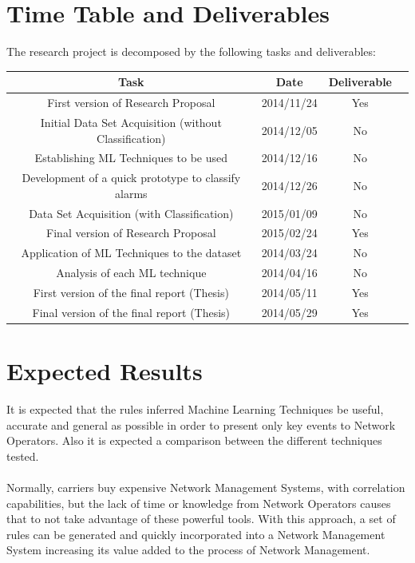 \documentclass[10pt,a4paper]{article}
\begin{document}
  \section{Time Table and Deliverables}
The research project is decomposed by the following tasks and deliverables:

\begin{center}
 \begin{tabular}{||c | c | c | c||} 
 \hline
 Task & Date & Deliverable \\ [0.7ex] 
 \hline\hline
 First version of Research Proposal  & 2014/11/24 & Yes \\ 
 \hline
 Initial Data Set Acquisition (without Classification) & 2014/12/05 & No \\ 
 \hline
 Establishing ML Techniques to be used & 2014/12/16 & No \\
 \hline
 Development of a quick prototype to classify alarms & 2014/12/26 & No \\
 \hline
 Data Set Acquisition (with Classification)  & 2015/01/09 & No \\
 \hline
 Final version of Research Proposal & 2015/02/24 & Yes \\ [1ex] 
 \hline
 Application of ML Techniques to the dataset & 2014/03/24 & No \\
 \hline
 Analysis of each ML technique & 2014/04/16 & No \\
 \hline
 First version of the final report (Thesis) & 2014/05/11 & Yes \\
 \hline
 Final version of the final report (Thesis) & 2014/05/29 & Yes \\

 \hline
\end{tabular}
\end{center}

  \section{Expected Results}

It is expected that the rules inferred Machine Learning Techniques be useful, accurate and general as possible in order to present only key events to Network Operators. Also it is expected a comparison between the different techniques tested.
\\\\
Normally, carriers buy expensive Network Management Systems, with correlation capabilities, but the lack of time or knowledge from Network Operators causes that to not take advantage of these powerful tools. With this approach, a set of rules can be generated and quickly incorporated into a Network Management System increasing its value added to the process of Network Management.
\end{document}
